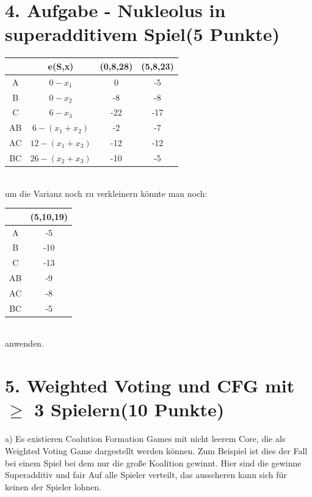 \documentclass[a4paper, 11pt]{article}
\begin{document}
\section*{4. Aufgabe - Nukleolus in superadditivem Spiel\hfill {\small (5 Punkte)}}
\begin{tabular}{c || c c c}
& e(S,x) & (0,8,28) & (5,8,23) \\ \hline
A & $0-x_1$ & 0 & -5\\
B & $0-x_2$ & -8 & -8\\
C & $6-x_3$ & -22 & -17\\
AB & $6-(x_1+x_2)$ & -2 & -7\\
AC & $12-(x_1+x_3)$ & -12 & -12\\
BC & $26-(x_2+x_3)$ & -10 & -5\\

\end{tabular}\\
um die Varianz noch zu verkleinern könnte man noch:

\begin{tabular}{c || c}
& (5,10,19) \\ \hline
A &-5\\
B & -10\\
C & -13\\
AB & -9\\
AC & -8\\
BC & -5\\

\end{tabular}\\
anwenden.

\section*{5. Weighted Voting und CFG mit $\geq$ 3 Spielern\hfill {\small (10 Punkte)}}

a) Es existieren Coalution Formation Games mit nicht leerem Core, die als Weighted
        Voting Game dargestellt werden können. Zum Beispiel ist dies der Fall bei
        einem Spiel bei dem nur die große Koalition gewinnt. Hier sind die gewinne
        Superadditiv und fair Auf alle Spieler verteilt, das ausscheren kann sich für
        keinen der Spieler lohnen.
\end{document}
